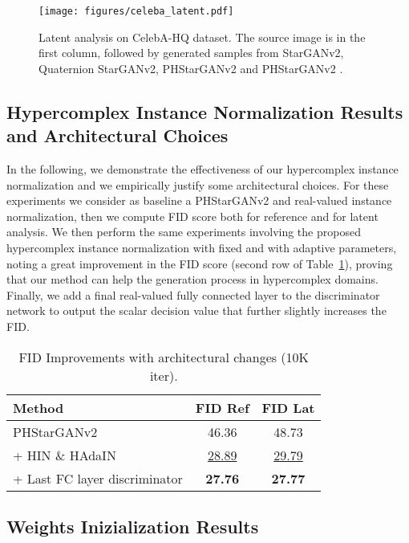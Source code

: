 \documentclass[conference]{IEEEtran}
\begin{document}
\begin{figure}[t]
    \centering
    \texttt{[image: figures/celeba\_latent.pdf]}
    \caption{Latent analysis on CelebA-HQ dataset. The source image is in the first column, followed by generated samples from StarGANv2, Quaternion StarGANv2, PHStarGANv2  and PHStarGANv2 .}
    \label{fig:latent_celeba}
\end{figure}
\subsection{Hypercomplex Instance Normalization Results and Architectural Choices}
In the following, we demonstrate the effectiveness of our hypercomplex instance normalization and we empirically justify some architectural choices. For these experiments we consider as baseline a PHStarGANv2  and real-valued instance normalization, then we compute FID score both for reference and for latent analysis. We then perform the same experiments involving the proposed hypercomplex instance normalization with fixed and with adaptive parameters, noting a great improvement in the FID score (second row of Table~\ref{tab:improv_FID}), proving that our method can help the generation process in hypercomplex domains. Finally, we add a final real-valued fully connected layer to the discriminator network to output the scalar decision value that further slightly increases the FID.
\begin{table}[]
\centering
\caption{FID Improvements with architectural changes (10K iter).}
\label{tab:improv_FID}
\begin{tabular}{l|cc}
\toprule Method & FID Ref  & FID Lat  \\ \hline
PHStarGANv2  & 46.36 & 48.73 \\
+ HIN \& HAdaIN & \underline{28.89} & \underline{29.79} \\
+ Last FC layer discriminator & \textbf{27.76} & \textbf{27.77} \\
\bottomrule
\end{tabular}
\end{table}

\subsection{Weights Inizialization Results}
\end{document}
